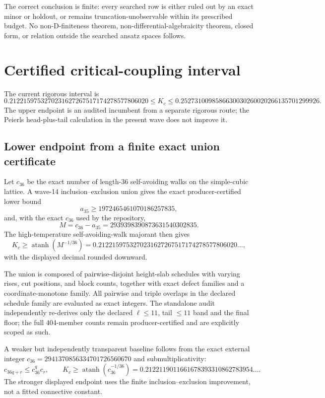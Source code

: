 \documentclass[11pt]{article}
\begin{document}
The correct conclusion is finite: every searched row is either ruled out by an exact minor or holdout, or remains truncation-unobservable within its prescribed budget.  No non-D-finiteness theorem, non-differential-algebraicity theorem, closed form, or relation outside the searched ansatz spaces follows.

\section{Certified critical-coupling interval}
The current rigorous interval is
\begin{equation}
\boxed{
0.2122159753270231627267517174278577806020
\le K_c\le
0.2527310098586630030260020266135701299926.}
\end{equation}
The upper endpoint is an audited incumbent from a separate rigorous route; the Peierls head-plus-tail calculation in the present wave does not improve it.

\subsection{Lower endpoint from a finite exact union certificate}
Let $c_{36}$ be the exact number of length-36 self-avoiding walks on the simple-cubic lattice.  A wave-14 inclusion--exclusion union gives the exact producer-certified lower bound
\[
 a_{35}\ge1972465461070186257835,
\]
and, with the exact $c_{36}$ used by the repository,
\[
 M=c_{36}-a_{35}=2939398390873631540302835.
\]
The high-temperature self-avoiding-walk majorant then gives
\[
 K_c\ge \operatorname{atanh}(M^{-1/36})
 =0.2122159753270231627267517174278577806020\ldots,
\]
with the displayed decimal rounded downward.

The union is composed of pairwise-disjoint height-slab schedules with varying rises, cut positions, and block counts, together with exact defect families and a coordinate-monotone family.  All pairwise and triple overlaps in the declared schedule family are evaluated as exact integers.  The standalone audit independently re-derives only the declared $\ell\le11$, tail $\le11$ band and the final floor; the full 404-member counts remain producer-certified and are explicitly scoped as such.

A weaker but independently transparent baseline follows from the exact external integer $c_{36}=2941370856334701726560670$ and submultiplicativity:
\[
 c_{36q+r}\le c_{36}^q c_r,
 \qquad
 K_c\ge \operatorname{atanh}(c_{36}^{-1/36})
 =0.2122119011661678393310862783954\ldots.
\]
The stronger displayed endpoint uses the finite inclusion--exclusion improvement, not a fitted connective constant.
\end{document}
